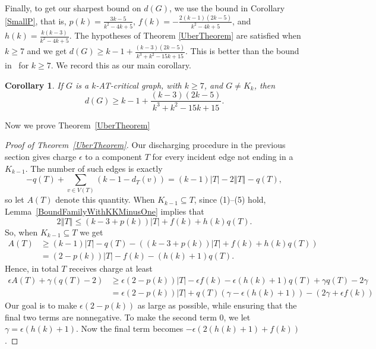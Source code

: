 \documentclass[12pt]{article}
\theoremstyle{plain}
\newtheorem{cor}[thm]{Corollary}
\theoremstyle{definition}
\theoremstyle{remark}
\newcommand{\set}[1]{\left\{ #1 \right\}}
\newcommand{\card}[1]{\left|#1\right|}
\newcommand{\size}[1]{\left\Vert#1\right\Vert}
\newcommand{\parens}[1]{\left( #1 \right)}
\begin{document}
Finally, to get our sharpest bound on $d(G)$, we use the bound in Corollary \ref{SmallP}, that is, $p(k) = \frac{3k-5}{k^2 - 4k + 5}$, $f(k) = -\frac{2(k-1)(2k-5)}{k^2 - 4k + 5}$, and $h(k) = \frac{k(k-3)}{k^2 - 4k + 5}$.  The hypotheses of Theorem \ref{UberTheorem} are satisfied when $k\ge7$ and we get $d(G) \ge k-1 + \frac{(k-3)(2k-5)}{k^3 + k^2 - 15k + 15}.$
 This is better than the bound in~\cite{OreVizing} for $k \ge 7$.  We record this as our main corollary.

\begin{cor}\label{MainCor}
If $G$ is a $k$-AT-critical graph, with $k\ge 7$, and $G\ne K_k$, then
 \[d(G) \ge k-1 + \frac{(k-3)(2k-5)}{k^3 + k^2 - 15k + 15}.\]
\end{cor}

Now we prove Theorem~\ref{UberTheorem}
\begin{proof}[Proof of Theorem~\ref{UberTheorem}]
Our discharging procedure in the previous section gives charge $\epsilon$ to a component $T$ for every incident edge not ending in a $K_{k-1}$.  The number of such edges is exactly
\[-q(T) + \sum_{v \in V(T)} (k-1 - d_T(v)) = (k-1)\card{T} - 2\size{T} - q(T),\]
so let $A(T)$ denote this quantity.  When $K_{k-1} \subseteq T$, since (1)--(5) hold, Lemma~\ref{BoundFamilyWithKKMinusOne} implies that
\[2\size{T} \le (k-3 + p(k))\card{T} + f(k) + h(k)q(T).\]
So, when $K_{k-1} \subseteq T$ we get
\begin{align*}
    A(T) & \ge (k-1)\card{T} - q(T) - ((k-3 + p(k))\card{T} + f(k) + h(k)q(T))\\
         &  =(2-p(k))\card{T} - f(k) - (h(k) + 1)q(T).
\end{align*}
Hence, in total $T$ receives charge at least
\begin{align*}
    \epsilon A(T) + \gamma(q(T) - 2) &\ge \epsilon(2-p(k))|T| - \epsilon f(k) - \epsilon (h(k)+1)q(T) +\gamma q(T)-2\gamma \\
    & = \epsilon(2-p(k))|T| + q(T)(\gamma - \epsilon (h(k)+1)) - (2\gamma + \epsilon f(k))
\end{align*}
Our goal is to make $\epsilon(2-p(k))$ as large as possible, while ensuring that the final two terms are nonnegative.  To make the second term 0, we let $\gamma = \epsilon(h(k) + 1)$.  Now the final term becomes $-\epsilon(2(h(k)+1)+f(k))$.
%

\end{proof}
\end{document}
